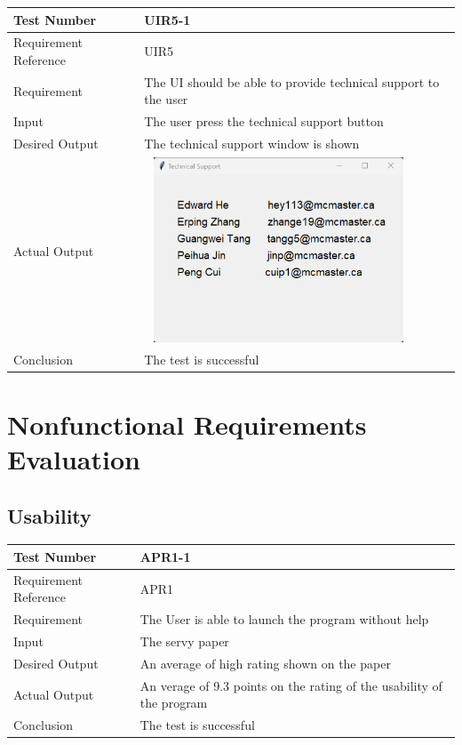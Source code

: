 \documentclass[12pt, titlepage]{article}
\begin{document}
\begin{table}[H]
\begin{center}
\begin{tabular}{|l | m{9cm}|}
\hline
  Test Number & UIR5-1\\
  \hline
  Requirement Reference & UIR5\\
  \hline
  Requirement & The UI should be able to provide  technical support to the user\\
  \hline
  Input & The user press the technical support button\\
  \hline
  Desired Output & The technical support window is shown\\
  \hline
  Actual Output & \includegraphics[width=80mm, height=55mm]{UIR51.png}\\
  \hline
  Conclusion & The test is successful\\
  \hline
\end{tabular}
\end{center}           
\end{table}

\section{Nonfunctional Requirements Evaluation}

\subsection{Usability}

\begin{table}[H]
\begin{center}
\begin{tabular}{|l | m{9cm}|}
\hline
  Test Number & APR1-1\\
  \hline
  Requirement Reference & APR1\\
  \hline
  Requirement & The User is able to launch the program without help\\
  \hline
  Input & The servy paper\\
  \hline
  Desired Output & An average of high rating shown on the paper\\
  \hline
  Actual Output & An verage of 9.3 points on the rating of the usability of the program\\
  \hline
  Conclusion & The test is successful\\
  \hline
\end{tabular}
\end{center}           
\end{table}
\end{document}
